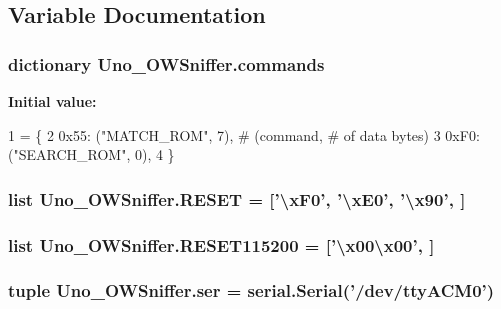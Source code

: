 \subsection{Variable Documentation}
\hypertarget{namespaceUno__OWSniffer_acad62719eb322f74fd0ad2b3189cef0a}{
\subsubsection[{commands}]{\setlength{\rightskip}{0pt plus 5cm}dictionary Uno\-\_\-\-O\-W\-Sniffer.\-commands}}\label{namespaceUno__OWSniffer_acad62719eb322f74fd0ad2b3189cef0a}
{\bfseries Initial value\-:}
\begin{DoxyCode}
1 = \{
2     0x55: (\textcolor{stringliteral}{"MATCH\_ROM"}, 7),    \textcolor{comment}{# (command, # of data bytes)}
3     0xF0: (\textcolor{stringliteral}{"SEARCH\_ROM"}, 0),
4 \}
\end{DoxyCode}
\hypertarget{namespaceUno__OWSniffer_a0c1cd33218ffd203a838f4c363260b49}{
\subsubsection[{R\-E\-S\-E\-T}]{\setlength{\rightskip}{0pt plus 5cm}list Uno\-\_\-\-O\-W\-Sniffer.\-R\-E\-S\-E\-T = \mbox{[}'\textbackslash{}x\-F0', '\textbackslash{}x\-E0', '\textbackslash{}x90', \mbox{]}}}\label{namespaceUno__OWSniffer_a0c1cd33218ffd203a838f4c363260b49}
\hypertarget{namespaceUno__OWSniffer_a81c5acf2bd7c14bbe7f42d298aecdbb2}{
\subsubsection[{R\-E\-S\-E\-T115200}]{\setlength{\rightskip}{0pt plus 5cm}list Uno\-\_\-\-O\-W\-Sniffer.\-R\-E\-S\-E\-T115200 = \mbox{[}'\textbackslash{}x00\textbackslash{}x00', \mbox{]}}}\label{namespaceUno__OWSniffer_a81c5acf2bd7c14bbe7f42d298aecdbb2}
\hypertarget{namespaceUno__OWSniffer_a89deaca78d0f86d69cd8825306cf0ac2}{
\subsubsection[{ser}]{\setlength{\rightskip}{0pt plus 5cm}tuple Uno\-\_\-\-O\-W\-Sniffer.\-ser = {\bf serial.\-Serial}('/dev/tty\-A\-C\-M0')}}\label{namespaceUno__OWSniffer_a89deaca78d0f86d69cd8825306cf0ac2}
